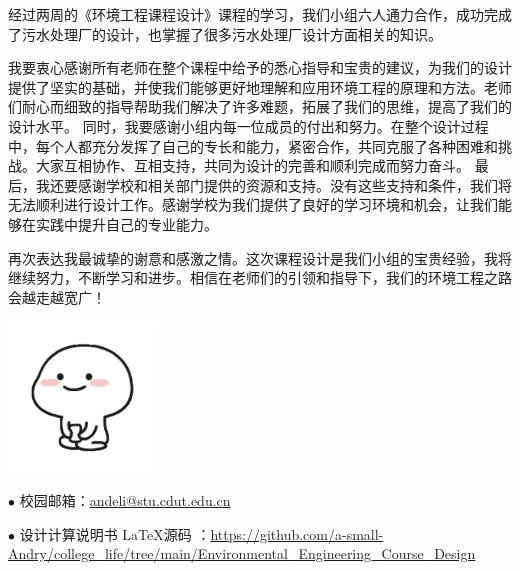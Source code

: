 \documentclass[hyperref,a4paper,cs4size,UTF8]{ctexart}                 %
\begin{document}
\newpage
{}


\begin{mythanks} %
	经过两周的《环境工程课程设计》课程的学习，我们小组六人通力合作，成功完成了污水处理厂的设计，也掌握了很多污水处理厂设计方面相关的知识。

	我要衷心感谢所有老师在整个课程中给予的悉心指导和宝贵的建议，为我们的设计提供了坚实的基础，并使我们能够更好地理解和应用环境工程的原理和方法。老师们耐心而细致的指导帮助我们解决了许多难题，拓展了我们的思维，提高了我们的设计水平。
	同时，我要感谢小组内每一位成员的付出和努力。在整个设计过程中，每个人都充分发挥了自己的专长和能力，紧密合作，共同克服了各种困难和挑战。大家互相协作、互相支持，共同为设计的完善和顺利完成而努力奋斗。
	最后，我还要感谢学校和相关部门提供的资源和支持。没有这些支持和条件，我们将无法顺利进行设计工作。感谢学校为我们提供了良好的学习环境和机会，让我们能够在实践中提升自己的专业能力。
	
	再次表达我最诚挚的谢意和感激之情。这次课程设计是我们小组的宝贵经验，我将继续努力，不断学习和进步。相信在老师们的引领和指导下，我们的环境工程之路会越走越宽广！

	\vfill
	\begin{center}
		\includegraphics[width=0.3\textwidth]{school_badge/guaiqiao1.png}
	\end{center}
	\vfill
	\noindent\dotfill

	\noindent$\bullet$ 校园邮箱：\href{mailto:andeli@stu.cdut.edu.cn}{andeli@stu.cdut.edu.cn}

	\noindent$\bullet$ 设计计算说明书 \LaTeX 源码\hypertarget{mythankslink}{}
	：\url{https://github.com/a-small-Andry/college_life/tree/main/Environmental_Engineering_Course_Design}
\end{mythanks}
\newpage
{}
\end{document}
